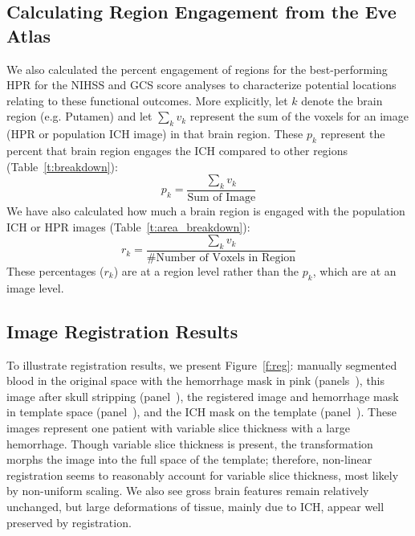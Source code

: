 \documentclass[10pt]{article}\usepackage[]{graphicx}\usepackage[]{color}
\begin{document}
\subsection{Calculating Region Engagement from the Eve Atlas}
\label{sec:calc_perc}
We also calculated the percent engagement of regions for the best-performing HPR for the NIHSS and GCS score analyses to characterize potential locations relating to these functional outcomes.  
More explicitly, let $k$ denote the brain region (e.g. Putamen) and let $\sum_{k} v_{k}$ represent the sum of the voxels for an image (HPR or population ICH image) in that brain region. These $p_{k}$ represent the percent that brain region engages the ICH compared to other regions (Table~\ref{t:breakdown}):
$$
  p_{k} = \frac{\sum_{k} v_{k}}{\text{Sum of Image}}
$$
We have also calculated how much a brain region is engaged with the population ICH or HPR images (Table~\ref{t:area_breakdown}):
$$
	r_{k} = \frac{\sum_{k} v_{k}}{\# \text{Number of Voxels in Region}}
$$
These percentages ($r_{k}$) are at a region level rather than the $p_k$, which are at an image level.



\subsection{Image Registration Results}


To illustrate registration results, we present Figure~\ref{f:reg}:  manually segmented blood in the original space with the hemorrhage mask in pink (panels~\protect{}), this image after skull stripping (panel~\protect{}), the registered image and hemorrhage mask in template space (panel~\protect{}), and the ICH mask on the template (panel~\protect{}).  These images represent one patient with variable slice thickness with a large hemorrhage.
Though variable slice thickness is present, the transformation morphs the image into the full space of the template; therefore, non-linear registration seems to reasonably account for variable slice thickness, most likely by non-uniform scaling.
We also see gross brain features remain relatively unchanged, but large deformations of tissue, mainly due to ICH, appear well preserved by registration.  
\end{document}
